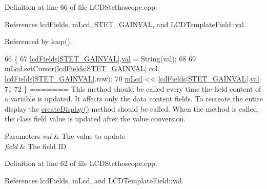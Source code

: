 \begin{DoxyCode}
Definition at line 66 of file L\-C\-D\-Stethoscope.\-cpp.



References lcd\-Fields, m\-Lcd, S\-T\-E\-T\-\_\-\-G\-A\-I\-N\-V\-A\-L, and L\-C\-D\-Template\-Field\-::val.



Referenced by loop().


\begin{DoxyCode}
66                                           \{
67     \hyperlink{class_l_c_d_stethoscope_ad36003e685beee5f2268fd4ef1f0db8c}{lcdFields}[\hyperlink{_l_c_d_templates_8h_a99df264a27c8c425105db42a1dbc5fbb}{STET\_GAINVAL}].\hyperlink{struct_l_c_d_template_field_a6eb7ce0547fc28ac3a2538f0fac3f117}{val} = String(val);
68   
69     \hyperlink{class_l_c_d_stethoscope_af91304920f29b700ae27aee8aba23ac1}{mLcd}.setCursor(\hyperlink{class_l_c_d_stethoscope_ad36003e685beee5f2268fd4ef1f0db8c}{lcdFields}[\hyperlink{_l_c_d_templates_8h_a99df264a27c8c425105db42a1dbc5fbb}{STET\_GAINVAL}].col, 
      \hyperlink{class_l_c_d_stethoscope_ad36003e685beee5f2268fd4ef1f0db8c}{lcdFields}[\hyperlink{_l_c_d_templates_8h_a99df264a27c8c425105db42a1dbc5fbb}{STET\_GAINVAL}].row);
70     \hyperlink{class_l_c_d_stethoscope_af91304920f29b700ae27aee8aba23ac1}{mLcd} << \hyperlink{class_l_c_d_stethoscope_ad36003e685beee5f2268fd4ef1f0db8c}{lcdFields}[\hyperlink{_l_c_d_templates_8h_a99df264a27c8c425105db42a1dbc5fbb}{STET\_GAINVAL}].\hyperlink{struct_l_c_d_template_field_a6eb7ce0547fc28ac3a2538f0fac3f117}{val};
71   
72 \}
=======
This method should be called every time the field content of a variable is updated. It affects only the data content fields. To recreate the entire display the \hyperlink{class_l_c_d_stethoscope_a2641dd844d4070d6f498ba20c04cdfac}{create\-Display()} method should be called. When the method is called, the class field value is updated after the value conversion.


\begin{DoxyParams}{Parameters}
{\em val} & The value to update \\
\hline
{\em field} & The field I\-D \\
\hline
\end{DoxyParams}


Definition at line 62 of file L\-C\-D\-Stethoscope.\-cpp.



References lcd\-Fields, m\-Lcd, and L\-C\-D\-Template\-Field\-::val.



\end{DoxyCode}
\end{DoxyCode}
